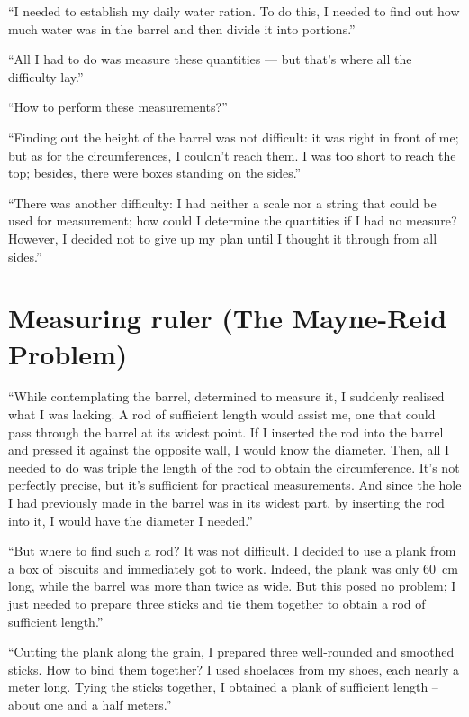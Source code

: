 ``I needed to establish my daily water ration. To do this, I needed to find out how much water was in the barrel and then divide it into portions.''

``All I had to do was measure these quantities — but that's where all the difficulty lay.''

``How to perform these measurements?''

``Finding out the height of the barrel was not difficult: it was right in front of me; but as for the circumferences, I couldn't reach them. I was too short to reach the top; besides, there were boxes standing on the sides.''

``There was another difficulty: I had neither a scale nor a string that could be used for measurement; how could I determine the quantities if I had no measure? However, I decided not to give up my plan until I thought it through from all sides.''

\section{Measuring ruler (The Mayne-Reid Problem)}
\label{sec-8.3}

``While contemplating the barrel, determined to measure it, I suddenly realised what I was lacking. A rod of sufficient length would assist me, one that could pass through the barrel at its widest point. If I inserted the rod into the barrel and pressed it against the opposite wall, I would know the diameter. Then, all I needed to do was triple the length of the rod to obtain the circumference. It's not perfectly precise, but it's sufficient for practical measurements. And since the hole I had previously made in the barrel was in its widest part, by inserting the rod into it, I would have the diameter I needed.''

``But where to find such a rod? It was not difficult. I decided to use a plank from a box of biscuits and immediately got to work. Indeed, the plank was only \SI{60}{\centi\meter} long, while the barrel was more than twice as wide. But this posed no problem; I just needed to prepare three sticks and tie them together to obtain a rod of sufficient length.''

``Cutting the plank along the grain, I prepared three well-rounded and smoothed sticks. How to bind them together? I used shoelaces from my shoes, each nearly a meter long. Tying the sticks together, I obtained a plank of sufficient length -- about one and a half meters.''

